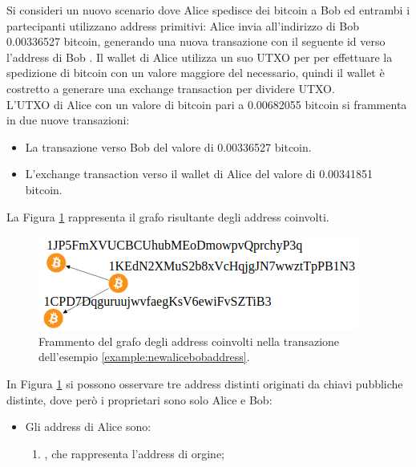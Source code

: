 \begin{example} \label{example:newalicebobaddress}
   Si consideri un nuovo scenario dove Alice spedisce dei bitcoin a Bob ed entrambi i partecipanti utilizzano address primitivi:  Alice invia all’indirizzo di Bob 0.00336527 bitcoin, generando una nuova transazione con il seguente id  verso l’address di Bob .
    Il wallet di Alice utilizza un suo UTXO per per effettuare la spedizione di bitcoin con un valore maggiore del necessario, quindi il wallet è costretto a generare una exchange transaction per dividere UTXO. \\
    L’UTXO di Alice con un valore di bitcoin pari a 0.00682055 bitcoin si frammenta in due nuove transazioni:

    \begin{itemize}
      \item La transazione verso Bob del valore di 0.00336527 bitcoin.
      \item L’exchange transaction verso il wallet di Alice del valore di 0.00341851 bitcoin.
    \end{itemize}

La Figura \ref{fig:newalicebobaddress} rappresenta il grafo risultante degli address coinvolti.

\begin{figure}
\centering
    \includegraphics[scale=0.43]{images/exampleWithGraph/example-p2pkh-exchange-transaction.png}
    \caption{Frammento  del grafo degli address coinvolti nella transazione dell’esempio \ref{example:newalicebobaddress}.\label{fig:newalicebobaddress}}
\end{figure}

    In Figura \ref{fig:newalicebobaddress} si possono osservare tre address distinti originati da chiavi pubbliche distinte, dove però i proprietari sono solo Alice e Bob:
    \begin{itemize}
      \item Gli address di Alice sono:
      \begin{enumerate}
      \item {}, che rappresenta l’address di orgine;


\end{enumerate}
\end{itemize}
\end{example}
